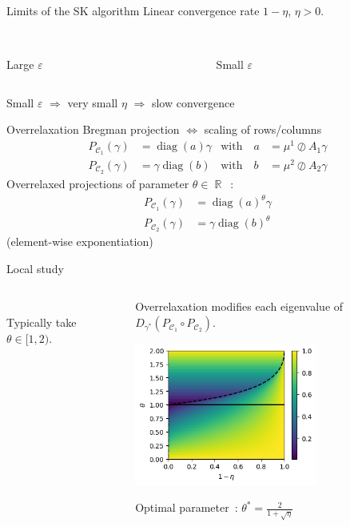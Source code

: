 \documentclass{beamer}
\DeclareMathOperator{\IR}{\mathbb{R}}
\DeclareMathOperator{\Ccal}{\mathcal{C}}
\DeclareMathOperator{\diag}{diag}
\renewcommand{\epsilon}{\varepsilon}
\begin{document}
\begin{frame}{Limits of the SK algorithm}
Linear convergence rate $1-\eta$, $\eta > 0$.

\begin{columns}
	\begin{column}{0.5\textwidth}
		\centering
		\\
		Large $\epsilon$
	\end{column}
	\begin{column}{0.5\textwidth}
		\centering
		\\
		Small $\epsilon$
	\end{column}
\end{columns}

Small $\epsilon$ $\Longrightarrow$
very small $\eta$ $\Longrightarrow$
slow convergence
\end{frame}

\begin{frame}{Overrelaxation}
Bregman projection $\Longleftrightarrow$ scaling of rows/columns
\begin{align}\label{scaling}
P_{\Ccal_1}(\gamma) &= \diag(a) \gamma &\text{with}\quad
a &=  {\mu^1}\oslash{A_1 \gamma} \\
P_{\Ccal_2}(\gamma) &= \gamma \diag(b) &\text{with}\quad
b &= {\mu^2}\oslash{A_2 \gamma}\nonumber
\end{align}
\pause
Overrelaxed projections of parameter $\theta \in \IR$~:
\begin{align}\label{or_scaling}
P_{\Ccal_1}(\gamma) &= \diag(a)^\theta \gamma\\
P_{\Ccal_2}(\gamma) &= \gamma \diag(b)^\theta \nonumber
\end{align}
(element-wise exponentiation)
\end{frame}

\begin{frame}{Local study}
\begin{columns}
	\begin{column}{0.4\textwidth}
		\centering
		\\
		Typically take $\theta \in [1,2)$.
	\end{column}
	\begin{column}{0.6\textwidth}
		\pause
		Overrelaxation modifies each eigenvalue of $D_{\gamma^*}(P_{\Ccal_1} \circ P_{\Ccal_2})$.
		\begin{center}
			\includegraphics[width=6cm]{images/eigen_transform.png}
		\end{center}
		\pause
		Optimal parameter~: $\theta^* = \frac{2}{1+\sqrt{\eta}}$
	\end{column}
\end{columns}
\end{frame}
\end{document}
